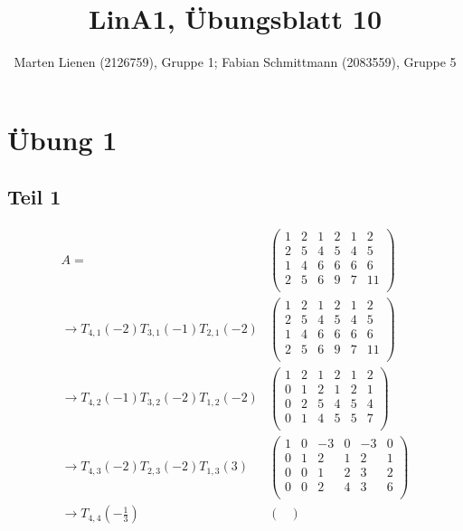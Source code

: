 \documentclass[a4paper,10pt]{article}
\title{LinA1, Übungsblatt 10}
\author{Marten Lienen (2126759), Gruppe 1; Fabian Schmittmann (2083559), Gruppe 5}
\begin{document}
\maketitle

\section*{Übung 1}

\subsection*{Teil 1}

\begin{align*}
 A = & \begin{pmatrix}
  1 & 2 & 1 & 2 & 1 & 2\\
  2 & 5 & 4 & 5 & 4 & 5\\
  1 & 4 & 6 & 6 & 6 & 6\\
  2 & 5 & 6 & 9 & 7 & 11\\
 \end{pmatrix}\\
 \longrightarrow T_{4,1}(-2)T_{3,1}(-1)T_{2,1}(-2)
 & \begin{pmatrix}
  1 & 2 & 1 & 2 & 1 & 2\\
  2 & 5 & 4 & 5 & 4 & 5\\
  1 & 4 & 6 & 6 & 6 & 6\\
  2 & 5 & 6 & 9 & 7 & 11\\
 \end{pmatrix}\\
 \longrightarrow T_{4,2}(-1)T_{3,2}(-2)T_{1,2}(-2)
 & \begin{pmatrix}
  1 & 2 & 1 & 2 & 1 & 2\\
  0 & 1 & 2 & 1 & 2 & 1\\
  0 & 2 & 5 & 4 & 5 & 4\\
  0 & 1 & 4 & 5 & 5 & 7\\
 \end{pmatrix}\\
 \longrightarrow T_{4,3}(-2)T_{2,3}(-2)T_{1,3}(3)
 & \begin{pmatrix}
  1 & 0 & -3 & 0 & -3 & 0\\
  0 & 1 & 2 & 1 & 2 & 1\\
  0 & 0 & 1 & 2 & 3 & 2\\
  0 & 0 & 2 & 4 & 3 & 6\\
 \end{pmatrix}\\
 \longrightarrow T_{4,4}(-\frac{1}{3})
 & \begin{pmatrix}

\end{pmatrix}
\end{align*}
\end{document}

